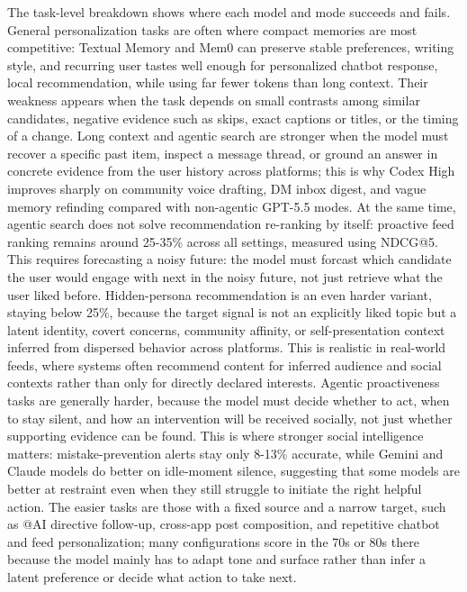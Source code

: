 \documentclass[]{fairmeta}
\begin{document}
The task-level breakdown shows where each model and mode succeeds and fails. General personalization tasks are often where compact memories are most competitive: Textual Memory and Mem0 can preserve stable preferences, writing style, and recurring user tastes well enough for personalized chatbot response, local recommendation, while using far fewer tokens than long context. Their weakness appears when the task depends on small contrasts among similar candidates, negative evidence such as skips, exact captions or titles, or the timing of a change. Long context and agentic search are stronger when the model must recover a specific past item, inspect a message thread, or ground an answer in concrete evidence from the user history across platforms; this is why Codex High improves sharply on community voice drafting, DM inbox digest, and vague memory refinding compared with non-agentic GPT-5.5 modes. At the same time, agentic search does not solve recommendation re-ranking by itself: proactive feed ranking remains around 25-35\% across all settings, measured using NDCG@5. This requires forecasting a noisy future: the model must forcast which candidate the user would engage with next in the noisy future, not just retrieve what the user liked before. Hidden-persona recommendation is an even harder variant, staying below 25\%, because the target signal is not an explicitly liked topic but a latent identity, covert concerns, community affinity, or self-presentation context inferred from dispersed behavior across platforms. This is realistic in real-world feeds, where systems often recommend content for inferred audience and social contexts rather than only for directly declared interests. Agentic proactiveness tasks are generally harder, because the model must decide whether to act, when to stay silent, and how an intervention will be received socially, not just whether supporting evidence can be found. This is where stronger social intelligence matters: mistake-prevention alerts stay only 8-13\% accurate, while Gemini and Claude models do better on idle-moment silence, suggesting that some models are better at restraint even when they still struggle to initiate the right helpful action. The easier tasks are those with a fixed source and a narrow target, such as @AI directive follow-up, cross-app post composition, and repetitive chatbot and feed personalization; many configurations score in the 70s or 80s there because the model mainly has to adapt tone and surface rather than infer a latent preference or decide what action to take next.
\end{document}
